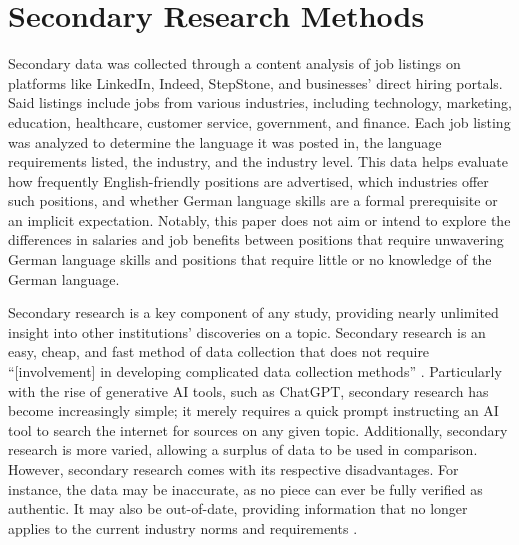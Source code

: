 \section{Secondary Research Methods}
Secondary data was collected through a content analysis of job listings on platforms like LinkedIn, Indeed, StepStone, and businesses’ direct hiring portals. Said listings include jobs from various industries, including technology, marketing, education, healthcare, customer service, government, and finance. Each job listing was analyzed to determine the language it was posted in, the language requirements listed, the industry, and the industry level. This data helps evaluate how frequently English-friendly positions are advertised, which industries offer such positions, and whether German language skills are a formal prerequisite or an implicit expectation. Notably, this paper does not aim or intend to explore the differences in salaries and job benefits between positions that require unwavering German language skills and positions that require little or no knowledge of the German language.  

Secondary research is a key component of any study, providing nearly unlimited insight into other institutions’ discoveries on a topic. Secondary research is an easy, cheap, and fast method of data collection that does not require “[involvement] in developing complicated data collection methods” \citep{Nasrudin25}. Particularly with the rise of generative AI tools, such as ChatGPT, secondary research has become increasingly simple; it merely requires a quick prompt instructing an AI tool to search the internet for sources on any given topic. Additionally, secondary research is more varied, allowing a surplus of data to be used in comparison. However, secondary research comes with its respective disadvantages. For instance, the data may be inaccurate, as no piece can ever be fully verified as authentic. It may also be out-of-date, providing information that no longer applies to the current industry norms and requirements \citep{Nasrudin25}.
